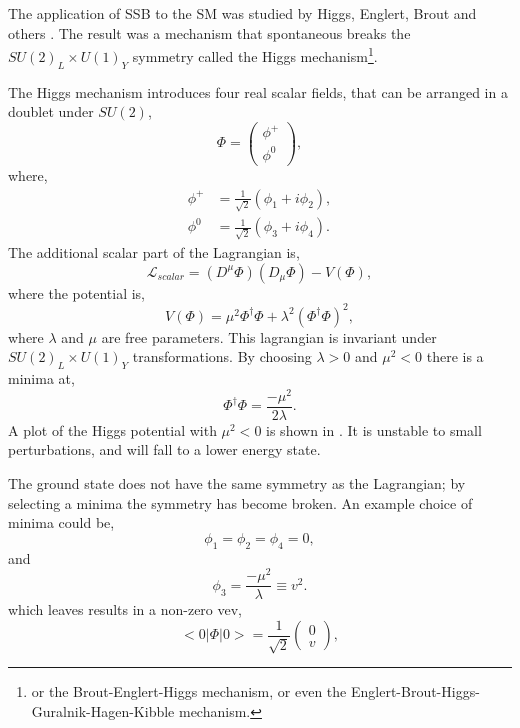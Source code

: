 The application of {SSB} to the {SM} was studied by Higgs, Englert, Brout
and others \cite{higgs1981broken, englert1964broken, guralnik1964global}.
The result was a mechanism that spontaneous breaks the
 $SU(2)_{L} \times U(1)_{Y}$ symmetry called the Higgs mechanism\footnote{or the
Brout-Englert-Higgs mechanism, or even the
Englert-Brout-Higgs-Guralnik-Hagen-Kibble mechanism.}.

The Higgs mechanism introduces four real scalar fields, that can be arranged in a
doublet under $SU(2)$,
\begin{equation}
\Phi = \left( \begin{matrix} \phi^{+} \\ \phi^{0} \end{matrix} \right),
\end{equation}
where,
\begin{align*}
\phi^{+} &=\frac{1}{\sqrt{2}} (\phi_{1} + i \phi_{2}),\\
\phi^{0} &=\frac{1}{\sqrt{2}} (\phi_{3} + i \phi_{4}).
\end{align*}
The additional scalar part of the Lagrangian is,
\begin{equation}
\mathcal{L}_{scalar} = 
\left(D^{\mu}\Phi\right) \left(D_{\mu}\Phi\right) - V(\Phi),
\end{equation}
where the potential is,
\begin{equation}
V(\Phi) = 
\mu^{2}\Phi^{\dagger}\Phi + 
\lambda^{2} \left( \Phi^{\dagger} \Phi \right)^{2},
\end{equation}
where $\lambda$ and $\mu$ are free parameters. This lagrangian is invariant
under $SU(2)_{L} \times U(1)_{Y}$ transformations.
By choosing  $\lambda>0$ and
$\mu^{2}<0$ there is a minima at,
\begin{equation}
\Phi^{\dagger} \Phi = \frac{- \mu^{2}}{2 \lambda}.
\end{equation}
A plot of the Higgs potential with $\mu^{2}<0$ is shown in
. It is unstable to small perturbations, and will fall
to a lower energy state. 

The ground state does not have the same symmetry as the Lagrangian; by
selecting a minima the symmetry has become broken. An example choice of minima
could be,
\begin{equation}
\phi_{1} = \phi_{2} = \phi_{4} = 0,
\end{equation}
and
\begin{equation}
\phi_{3} = \frac{-\mu^{2}}{\lambda} \equiv v^{2}.
\end{equation}
which leaves results in a non-zero {vev},
\begin{equation}
<0|\Phi|0> = \frac{1}{\sqrt{2}}\left(\begin{matrix}0\\v\end{matrix}\right),
\end{equation}

